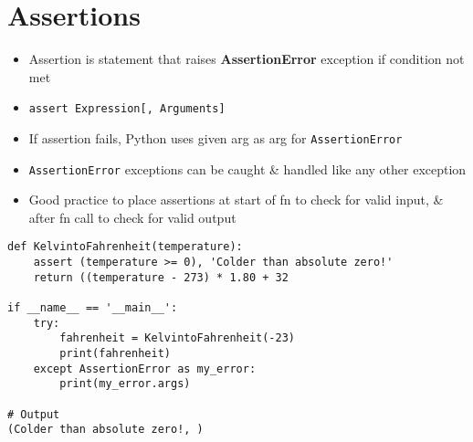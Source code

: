 \documentclass{article}
\begin{document}
\section{Assertions}
        \begin{multicols}{2}
        \begin{itemize}
            \item Assertion is statement that raises \textbf{AssertionError} exception if condition not met
            \item \texttt{assert Expression[, Arguments]}
            \item If assertion fails, Python uses given arg as arg for \texttt{AssertionError}
            \item \texttt{AssertionError} exceptions can be caught \& handled like any other exception
            \item Good practice to place assertions at start of fn to check for valid input, \& after fn call to check for valid output
        \end{itemize}
    \end{multicols}
\vspace{-2em}
\begin{lstlisting}
def KelvintoFahrenheit(temperature):
    assert (temperature >= 0), 'Colder than absolute zero!'
    return ((temperature - 273) * 1.80 + 32

if __name__ == '__main__':
    try:
        fahrenheit = KelvintoFahrenheit(-23)
        print(fahrenheit)
    except AssertionError as my_error:
        print(my_error.args)

# Output
(Colder than absolute zero!, )
\end{lstlisting}
\end{document}

